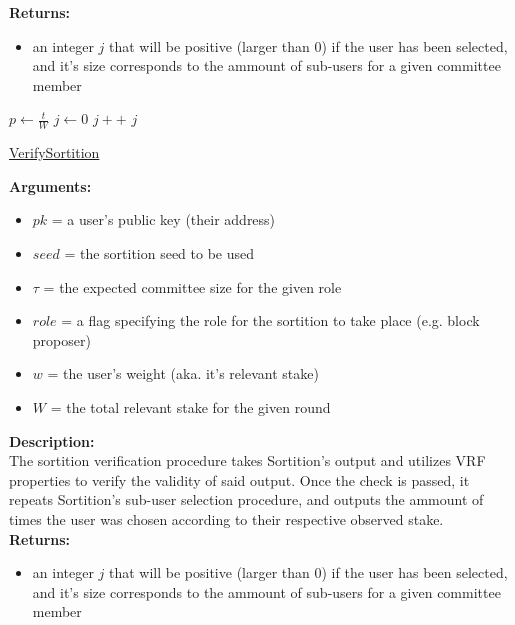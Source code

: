\documentclass[10pt,a4paper]{article}
\begin{document}
\noindent \textbf{Returns:}
\begin{itemize}
    \item an integer $j$ that will be positive (larger than 0) if the user has been selected, and it's size corresponds to the ammount
    of sub-users for a given committee member
  \end{itemize}

\begin{algorithm}[H]
    \begin{algorithmic}[H]
        \State $p \gets \frac{t}{W}$
        \State $j \gets 0$
        \While{$\frac{hash}{2^{hashlen}} \notin [\sum_{k=0}^jB(k;w,p), \sum_{k=0}^{j+1}B(k;w,p))$}
            \State $j++$
        \EndWhile
        \Return $j$
    \EndFunction
    \end{algorithmic}
    \caption{\underline{VerifySortition}}
\end{algorithm}

\noindent \textbf{Arguments:}
\begin{itemize}
    \item $pk$ = a user's public key (their address)
    \item $seed$ = the sortition seed to be used
    \item $\tau$ = the expected committee size for the given role
    \item $role$ = a flag specifying the role for the sortition to take place (e.g. block proposer)
    \item $w$ = the user's weight (aka. it's relevant stake)
    \item $W$ = the total relevant stake for the given round
  \end{itemize}

\noindent \textbf{Description:}\\
The sortition verification procedure takes Sortition's output and utilizes VRF properties to verify the validity of said output.
Once the check is passed, it repeats Sortition's sub-user selection procedure, and outputs the ammount of times the user was chosen
according to their respective observed stake.\\

\noindent \textbf{Returns:}
\begin{itemize}
    \item an integer $j$ that will be positive (larger than 0) if the user has been selected, and it's size corresponds to the ammount
    of sub-users for a given committee member
  \end{itemize}
\end{document}
